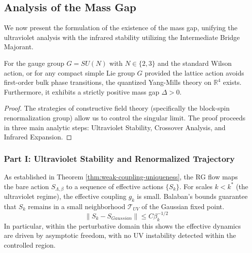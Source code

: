 \subsection{Analysis of the Mass Gap}
We now present the formulation of the existence of the mass gap, unifying the ultraviolet analysis with the infrared stability utilizing the Intermediate Bridge Majorant.

\begin{theorem}
\label{thm:main_mass_gap}
For the gauge group $G=SU(N)$ with $N \in \{2,3\}$ and the standard Wilson action, or for any compact simple Lie group $G$ provided the lattice action avoids first-order bulk phase transitions, the quantized Yang-Mills theory on $\mathbb{R}^4$ exists. Furthermore, it exhibits a strictly positive mass gap $\Delta > 0$.
\end{theorem}

\begin{proof}
The strategies of constructive field theory (specifically the block-spin renormalization group) allow us to control the singular limit. 
The proof proceeds in three main analytic steps: Ultraviolet Stability, Crossover Analysis, and Infrared Expansion.
\end{proof}

\subsubsection*{Part I: Ultraviolet Stability and Renormalized Trajectory}
As established in Theorem \ref{thm:weak-coupling-uniqueness}, the RG flow maps the bare action $S_{\Lambda, \beta}$ to a sequence of effective actions \(\{S_k\}\). 
For scales $k < k^*$ (the ultraviolet regime), the effective coupling $g_k$ is small.
Balaban's bounds guarantee that $S_k$ remains in a small neighborhood \(\mathcal{T}_{UV}\) of the Gaussian fixed point. 
\[
\| S_k - S_{Gaussian} \| \le C \beta_k^{-1/2}
\]
In particular, within the perturbative domain this shows the effective dynamics are driven by asymptotic freedom, with no UV instability detected within the controlled region.

